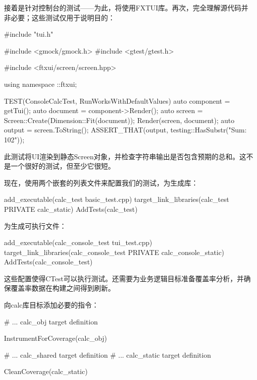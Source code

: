 接着是针对控制台的测试——为此，将使用FXTUI库。再次，完全理解源代码并非必要；这些测试仅用于说明目的：


\begin{cmake}
#include "tui.h"

#include <gmock/gmock.h>
#include <gtest/gtest.h>

#include <ftxui/screen/screen.hpp>

using namespace ::ftxui;

TEST(ConsoleCalcTest, RunWorksWithDefaultValues) {
    auto component = getTui();
    auto document = component->Render();
    auto screen = Screen::Create(Dimension::Fit(document));
    Render(screen, document);
    auto output = screen.ToString();
    ASSERT_THAT(output, testing::HasSubstr("Sum: 102"));
}
\end{cmake}

此测试将UI渲染到静态Screen对象，并检查字符串输出是否包含预期的总和。这不是一个很好的测试，但至少它很短。

现在，使用两个嵌套的列表文件来配置我们的测试，为生成库：


\begin{cmake}
add_executable(calc_test basic_test.cpp)
target_link_libraries(calc_test PRIVATE calc_static)
AddTests(calc_test)
\end{cmake}

为生成可执行文件：


\begin{cmake}
add_executable(calc_console_test tui_test.cpp)
target_link_libraries(calc_console_test
                      PRIVATE calc_console_static)
AddTests(calc_console_test)
\end{cmake}

这些配置使得CTest可以执行测试。还需要为业务逻辑目标准备覆盖率分析，并确保覆盖率数据在构建之间得到刷新。

向calc库目标添加必要的指令：


\begin{cmake}
# ... calc_obj target definition

InstrumentForCoverage(calc_obj)

# ... calc_shared target definition
# ... calc_static target definition

CleanCoverage(calc_static)
\end{cmake}

